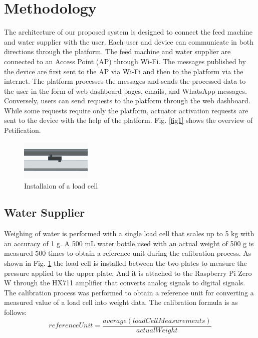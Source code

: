 \documentclass[conference]{IEEEtran}
\begin{document}
\section{Methodology}
The architecture of our proposed system is designed to connect the feed machine and water supplier with the user.
Each user and device can communicate in both directions through the platform.
The feed machine and water supplier are connected to an Access Point (AP) through Wi-Fi.
The messages published by the device are first sent to the AP via Wi-Fi and then to the platform via the internet.
The platform processes the messages and sends the processed data to the user in the form of web dashboard pages, emails, and WhatsApp messages.
Conversely, users can send requests to the platform through the web dashboard.
While some requests require only the platform, actuator activation requests are sent to the device with the help of the platform.
Fig. \ref{fig1} shows the overview of Petification.

\begin{figure}[htbp]
\centerline{\includegraphics[width=0.3\textwidth]{./images/load-cell.png}}
\caption{Installaion of a load cell}
\label{fig2}
\end{figure}

\subsection{Water Supplier}
Weighing of water is performed with a single load cell that scales up to 5 kg with an accuracy of 1 g. A 500 mL water bottle used with an actual weight of 500 g is measured 500 times to obtain a reference unit during the calibration process.
As shown in Fig. \ref{fig2} the load cell is installed between the two plates to measure the pressure applied to the upper plate. And it is attached to the Raspberry Pi Zero W through the HX711 amplifier that  converts analog signals to digital signals. 
The calibration process was performed to obtain a reference unit for converting a measured value of a load cell into weight data.
The calibration formula is as follows:
\begin{equation}
   referenceUnit = \frac{average(loadCellMeasurements)}{actualWeight}
\end{equation}
\end{document}
